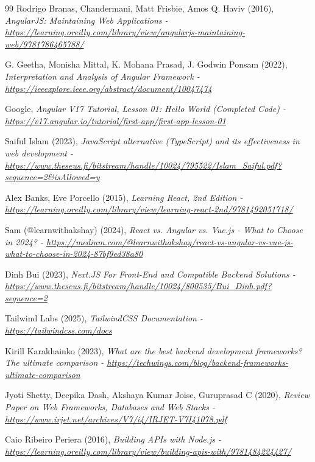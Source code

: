 \documentclass[]{final_report}
\begin{document}
\begin{thebibliography}{99}
 Rodrigo Branas, Chandermani, Matt Frisbie, Amos Q. Haviv (2016),
\emph{AngularJS: Maintaining Web Applications - \url{https://learning.oreilly.com/library/view/angularjs-maintaining-web/9781786465788/}}

 G. Geetha, Monisha Mittal, K. Mohana Prasad, J. Godwin Ponsam (2022),
\emph{Interpretation and Analysis of Angular Framework - \url{https://ieeexplore.ieee.org/abstract/document/10047474}}

 Google, 
\emph{Angular V17 Tutorial, Lesson 01: Hello World (Completed Code) - \url{https://v17.angular.io/tutorial/first-app/first-app-lesson-01}}

 Saiful Islam (2023),
\emph{JavaScript alternative (TypeScript) and its effectiveness in web development - \url{https://www.theseus.fi/bitstream/handle/10024/795522/Islam_Saiful.pdf?sequence=2&isAllowed=y}}

 Alex Banks, Eve Porcello (2015),
\emph{Learning React, 2nd Edition - \url{https://learning.oreilly.com/library/view/learning-react-2nd/9781492051718/}}

 Sam (@learnwithakshay) (2024),
\emph{React vs. Angular vs. Vue.js - What to Choose in 2024? - \url{https://medium.com/@learnwithakshay/react-vs-angular-vs-vue-js-what-to-choose-in-2024-87bf9ed38a80}}

 Dinh Bui (2023),
\emph{Next.JS For Front-End and Compatible Backend Solutions - \url{https://www.theseus.fi/bitstream/handle/10024/800535/Bui_Dinh.pdf?sequence=2}}

 Tailwind Labs (2025),
\emph{TailwindCSS Documentation - \url{https://tailwindcss.com/docs}}

 Kirill Karakhainko (2023),
\emph{What are the best backend development frameworks? The ultimate comparison - \url{https://techwings.com/blog/backend-frameworks-ultimate-comparison}}

 Jyoti Shetty, Deepika Dash, Akshaya Kumar Joise, Guruprasad C (2020),
\emph{Review Paper on Web Frameworks, Databases and Web Stacks - \url{https://www.irjet.net/archives/V7/i4/IRJET-V7I41078.pdf}}

 Caio Ribeiro Periera (2016),
\emph{Building APIs with Node.js - \url{https://learning.oreilly.com/library/view/building-apis-with/9781484224427/}}


\end{thebibliography}
\end{document}
